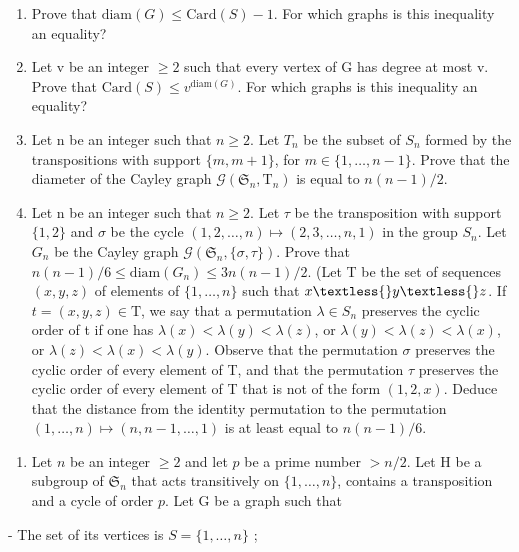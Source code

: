 \begin{enumerate}
\def\labelenumi{\alph{enumi})}
\item
  Prove that \(\text{diam}(G) \leqslant \text{Card}(S)-1\). For which graphs is this inequality an equality?
\item
  Let v be an integer \(\geqslant 2\) such that every vertex of G has degree at most v. Prove that \(\text{Card}(S) \leqslant v^{\text{diam}(G)}\). For which graphs is this inequality an equality?
\item
  Let n be an integer such that \(n \geqslant 2\). Let \(T_{n}\) be the subset of \(S_{n}\) formed by the transpositions with support \(\{m, m + 1\}\), for \(m \in \{1, \ldots, n - 1\}\). Prove that the diameter of the Cayley graph \(\mathcal{G}(\mathfrak{S}_{n}, \mathrm{T}_{n})\) is equal to \(n(n - 1)/2\).
\item
  Let n be an integer such that \(n \geqslant 2\). Let \(\tau\) be the transposition with support \(\{1,2\}\) and \(\sigma\) be the cycle \((1,2,\ldots,n) \mapsto (2,3,\ldots,n,1)\) in the group \(S_n\). Let \(G_n\) be the Cayley graph \(\mathcal{G}(\mathfrak{S}_n,\{\sigma,\tau\})\). Prove that \(n(n-1)/6 \leqslant \text{diam}(G_n) \leqslant 3n(n-1)/2\). (Let T be the set of sequences \((x,y,z)\) of elements of \(\{1,\ldots,n\}\) such that \(x \textless{} y \textless{} z\). If \(t=(x,y,z)\in\text{T}\), we say that a permutation \(\lambda\in S_n\) preserves the cyclic order of t if one has \(\lambda(x)<\lambda(y)<\lambda(z)\), or \(\lambda(y)<\lambda(z)<\lambda(x)\), or \(\lambda(z)<\lambda(x)<\lambda(y)\). Observe that the permutation \(\sigma\) preserves the cyclic order of every element of T, and that the permutation \(\tau\) preserves the cyclic order of every element of T that is not of the form \((1,2,x)\). Deduce that the distance from the identity permutation to the permutation \((1,\ldots,n) \mapsto (n,n-1,\ldots,1)\) is at least equal to \(n(n-1)/6\).
\end{enumerate}

\begin{enumerate}
\def\labelenumi{\arabic{enumi})}
\setcounter{enumi}{11}
\tightlist
\item
  Let \(n\) be an integer \(\geqslant 2\) and let \(p\) be a prime number \(>n/2\). Let H be a subgroup of \(\mathfrak{S}_n\) that acts transitively on \(\{1, \ldots, n\}\), contains a transposition and a cycle of order \(p\). Let G be a graph such that
\end{enumerate}

- The set of its vertices is \(S = \{1, \ldots, n\}\) ;

